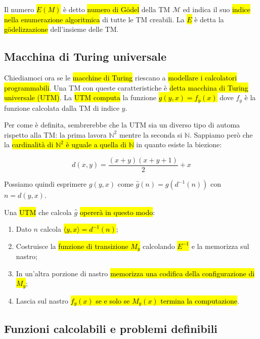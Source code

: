 \documentclass[a4paper,11pt,oneside]{article}
\theoremstyle{plain}
\theoremstyle{definition}
\theoremstyle{remark}
\begin{document}
Il numero \hl{$E(M)$} è detto \hl{numero di Gödel} della TM $\mathcal{M}$ ed
indica il suo \hl{indice nella enumerazione algoritmica} di tutte le TM
creabili. La \hl{$E$} è detta la \hl{gödelizzazione} dell'insieme delle TM\@.

\subsection{Macchina di Turing universale}\label{sec:utm}

Chiediamoci ora se le \hl{macchine di Turing} riescano a \hl{modellare i
calcolatori programmabili}. Una TM con queste caratteristiche è \hl{detta
macchina di Turing universale (UTM)}. La \hl{UTM computa} la funzione
\hl{$g(y,x) = f_y(x)$} dove $f_y$ è la funzione calcolata dalla TM di indice
$y$.

Per come è definita, sembrerebbe che la UTM sia un diverso tipo di automa
rispetto alla TM\@: la prima lavora $\mathbb{N}^2$ mentre la seconda si
$\mathbb{N}$. Sappiamo però che la \hl{cardinalità di $\mathbb{N}^2$ è uguale a
quella di $\mathbb{N}$} in quanto esiste la biezione:

\begin{equation}
  d(x,y) = \frac{(x+y)(x+y+1)}{2} + x
\end{equation}

Possiamo quindi esprimere $g(y,x)$ come $\hat{g}(n) = g(d^{-1}(n))$ con $n =
d(y,x)$.

Una \hl{UTM} che calcola $\hat{g}$ \hl{opererà in questo modo}:

\begin{enumerate}
  \item Dato $n$ calcola \hl{$\langle y,x \rangle = d^{-1}(n)$};
  \item Costruisce la \hl{funzione di transizione $M_y$} calcolando
    \hl{$E^{-1}$} e la memorizza sul nastro;
  \item In un'altra porzione di nastro \hl{memorizza una codifica della
    configurazione di $M_y$};
  \item Lascia sul nastro \hl{$f_y(x)$ se e solo se $M_y(x)$ termina la
    computazione}.
\end{enumerate}

\subsection{Funzioni calcolabili e problemi definibili}\label{sec:func-calc}
\end{document}
